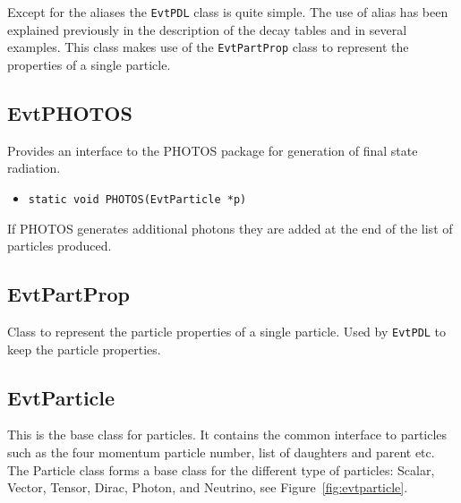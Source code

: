 Except for the aliases the {\tt EvtPDL} class is quite simple. The use
of alias has been explained previously in the description of the
decay tables and in several examples. This class makes use of the 
{\tt EvtPartProp} class to represent the properties of a single particle.


\subsection{EvtPHOTOS}

Provides an interface to the PHOTOS package for generation of 
final state radiation.

\begin{itemize}
\item {\tt static void PHOTOS(EvtParticle *p)}
\end{itemize}

If PHOTOS generates additional photons they are added at the 
end of the list of particles produced.

\subsection{EvtPartProp}

Class to represent the particle properties of a single
particle. Used by {\tt EvtPDL} to keep the particle
properties.

\subsection{EvtParticle}




This is the base class for particles. It contains the common
interface to particles such as
the four momentum particle number, list of daughters and parent
etc. The Particle class forms a base class for the different
type of particles: Scalar, Vector, Tensor, Dirac, Photon,
and Neutrino, see Figure~\ref{fig:evtparticle}.


